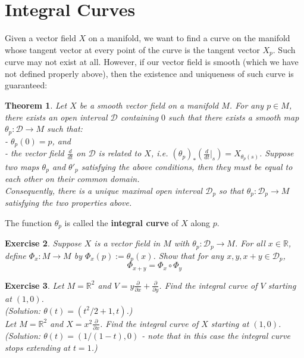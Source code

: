\documentclass[11pt]{book}
\newtheorem{theorem}{Theorem}[section]
\newtheorem{exercise}[theorem]{Exercise}
\newcommand{\bb}[1]{\mathbb{#1}}
\newcommand{\mc}[1]{\mathcal{#1}}
\begin{document}
\section{Integral Curves}
Given a vector field $X$ on a manifold, we want to find a curve on the manifold whose tangent vector at every point of the curve is the tangent vector $X_p$. Such curve may not exist at all. However, if our vector field is smooth (which we have not defined properly above), then the existence and uniqueness of such curve is guaranteed:
\begin{theorem}\label{intcurve}
Let $X$ be a smooth vector field on a manifold $M$. For any $p \in M$, there exists an open interval $\mc{D}$ containing $0$ such that there exists a smooth map $\theta_p: \mc{D} \to M$ such that:\\
- $\theta_p(0) = p$, and\\
- the vector field $\frac{d}{dt}$ on $\mc{D}$ is related to $X$, i.e. $(\theta_p)_*(\frac{d}{dt}  \Big|_s) = X_{\theta_p(s)}$.
Suppose two maps $\theta_p$ and $\theta'_p$ satisfying the above conditions, then they must be equal to each other on their common domain.\\
Consequently, there is a unique maximal open interval $\mc{D}_p$ so that $\theta_p : \mc{D}_p \to M$ satisfying the two properties above.
\end{theorem}
The function $\theta_p$ is called the \textbf{integral curve} of $X$ along $p$.\\
\begin{exercise}
Suppose $X$ is a vector field in $M$ with $\theta_p: \mc{D}_p \to M$. For all $x \in \bb{R}$, define $\Phi_x : M \to M$ by $\Phi_x(p) := \theta_p(x)$. Show that for any $x, y, x+y \in \mc{D}_p$,
$$\Phi_{x+y} = \Phi_x \circ \Phi_y$$
\end{exercise}

\begin{exercise}
Let $M = \bb{R}^2$ and $V = y\frac{\partial}{\partial x}+ \frac{\partial}{\partial y}$. Find the integral curve of $V$ starting at $(1,0)$.\\
(Solution: $\theta(t) = (t^2/2 + 1, t)$.)\\
Let $M = \bb{R}^2$ and $X = x^2\frac{\partial}{\partial x}$. Find the integral curve of $X$ starting at $(1,0)$.\\
(Solution: $\theta(t) = (1/(1-t) , 0)$ - note that in this case the integral curve stops extending at $t = 1$.)
\end{exercise}
\end{document}
